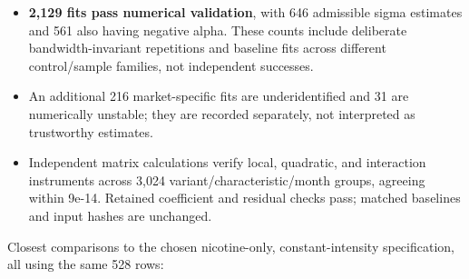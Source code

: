 \documentclass[10pt,]{article}
\providecommand{\tightlist}{%
  \setlength{\itemsep}{0pt}\setlength{\parskip}{0pt}}
\begin{document}
\begin{itemize}
\tightlist
\item
  \textbf{2,129 fits pass numerical validation}, with 646 admissible
  sigma estimates and 561 also having negative alpha. These counts
  include deliberate bandwidth-invariant repetitions and baseline fits
  across different control/sample families, not independent successes.
\item
  An additional 216 market-specific fits are underidentified and 31 are
  numerically unstable; they are recorded separately, not interpreted as
  trustworthy estimates.
\item
  Independent matrix calculations verify local, quadratic, and
  interaction instruments across 3,024 variant/characteristic/month
  groups, agreeing within 9e-14. Retained coefficient and residual
  checks pass; matched baselines and input hashes are unchanged.
\end{itemize}

Closest comparisons to the chosen nicotine-only, constant-intensity
specification, all using the same 528 rows:
\end{document}

